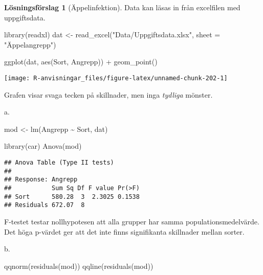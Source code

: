 \documentclass[
]{book}
\newenvironment{Shaded}{\begin{snugshade}}{\end{snugshade}}
\newcommand{\AttributeTok}[1]{\textcolor[rgb]{0.77,0.63,0.00}{#1}}
\newcommand{\FunctionTok}[1]{\textcolor[rgb]{0.00,0.00,0.00}{#1}}
\newcommand{\NormalTok}[1]{#1}
\newcommand{\OtherTok}[1]{\textcolor[rgb]{0.56,0.35,0.01}{#1}}
\newcommand{\SpecialCharTok}[1]{\textcolor[rgb]{0.00,0.00,0.00}{#1}}
\newcommand{\StringTok}[1]{\textcolor[rgb]{0.31,0.60,0.02}{#1}}
\theoremstyle{definition}
\theoremstyle{definition}
\theoremstyle{definition}
\theoremstyle{definition}
\newtheorem{hypothesis}{Lösningsförslag}[chapter]
\theoremstyle{remark}
\begin{document}
\begin{hypothesis}[Äppelinfektion]
Data kan läsas in från excelfilen med uppgiftsdata.

\begin{Shaded}
\begin{Highlighting}[]
\FunctionTok{library}\NormalTok{(readxl)}
\NormalTok{dat }\OtherTok{\textless{}{-}} \FunctionTok{read\_excel}\NormalTok{(}\StringTok{"Data/Uppgiftsdata.xlsx"}\NormalTok{, }\AttributeTok{sheet =} \StringTok{"Äppelangrepp"}\NormalTok{)}

\FunctionTok{ggplot}\NormalTok{(dat, }\FunctionTok{aes}\NormalTok{(Sort, Angrepp)) }\SpecialCharTok{+}
  \FunctionTok{geom\_point}\NormalTok{()}
\end{Highlighting}
\end{Shaded}

\begin{center}\texttt{[image: R-anvisningar\_files/figure-latex/unnamed-chunk-202-1]} \end{center}

Grafen visar svaga tecken på skillnader, men inga \emph{tydliga} mönster.

a.

\begin{Shaded}
\begin{Highlighting}[]
\NormalTok{mod }\OtherTok{\textless{}{-}} \FunctionTok{lm}\NormalTok{(Angrepp }\SpecialCharTok{\textasciitilde{}}\NormalTok{ Sort, dat)}

\FunctionTok{library}\NormalTok{(car)}
\FunctionTok{Anova}\NormalTok{(mod)}
\end{Highlighting}
\end{Shaded}

\begin{verbatim}
## Anova Table (Type II tests)
## 
## Response: Angrepp
##           Sum Sq Df F value Pr(>F)
## Sort      580.28  3  2.3025 0.1538
## Residuals 672.07  8
\end{verbatim}

F-testet testar nollhypotesen att alla grupper har samma populationsmedelvärde. Det höga p-värdet ger att det inte finns signifikanta skillnader mellan sorter.

b.

\begin{Shaded}
\begin{Highlighting}[]
\FunctionTok{qqnorm}\NormalTok{(}\FunctionTok{residuals}\NormalTok{(mod))}
\FunctionTok{qqline}\NormalTok{(}\FunctionTok{residuals}\NormalTok{(mod))}
\end{Highlighting}
\end{Shaded}


\end{hypothesis}
\end{document}
